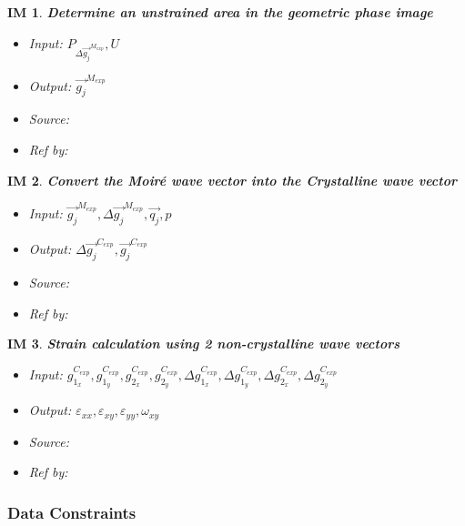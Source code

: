 \documentclass[12pt]{article}
\newtheorem{IM}{IM}
\begin{document}
\begin{IM}
\noindent\colorbox{shadecolorIM}{\normalfont \textbf{Determine an unstrained area in the geometric phase image}}
\normalfont
\begin{itemize}
\item Input: $P_{\Delta \overrightarrow{g_{j}}^{M_{exp}}},U$
\item Output: $\overrightarrow{g_{j}}^{M_{exp}}$
\item Source:
\item Ref by:
\end{itemize}
\label{IM_3}
\end{IM}

\begin{IM}
\noindent\colorbox{shadecolorIM}{\normalfont \textbf{Convert the Moir{\'e} wave vector into the Crystalline wave vector}}
\normalfont
\begin{itemize}
\item Input: $\overrightarrow{g_{j}}^{M_{exp}},\Delta \overrightarrow{g_{j}}^{M_{exp}},\overrightarrow{q_{j}},p$
\item Output: $\Delta \overrightarrow{g_{j}}^{C_{exp}},\overrightarrow{g_{j}}^{C_{exp}}$
\item Source:
\item Ref by:
\end{itemize}
\label{IM_4}
\end{IM}

\begin{IM}
\noindent\colorbox{shadecolorIM}{\normalfont \textbf{Strain calculation using 2 non-crystalline wave vectors}}
\normalfont
\begin{itemize}
\item Input: $g_{1_{x}}^{C_{exp}}, g_{1_{y}}^{C_{exp}},g_{2_{x}}^{C_{exp}}, g_{2_{y}}^{C_{exp}}, \Delta g_{1_{x}}^{C_{exp}}, \Delta g_{1_{y}}^{C_{exp}},\Delta g_{2_{x}}^{C_{exp}},\Delta g_{2_{y}}^{C_{exp}}$
\item Output: $\varepsilon_{xx},\varepsilon_{xy},\varepsilon_{yy},\omega_{xy}$
\item Source:
\item Ref by:
\end{itemize}
\label{IM_5}
\end{IM}

\subsubsection{Data Constraints} \label{sec_DataConstraints}    
\end{document}
